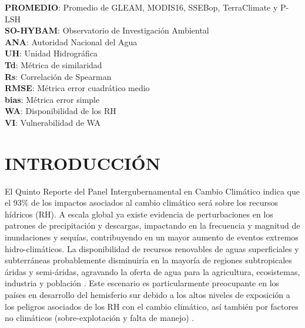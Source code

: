\documentclass[12pt]{article}
\begin{document}
\textbf{PROMEDIO}: Promedio de GLEAM, MODIS16, SSEBop, TerraClimate y P-LSH \\
\textbf{SO-HYBAM}: Observatorio de Investigación Ambiental \\
\textbf{ANA}: Autoridad Nacional del Agua \\
\textbf{UH}: Unidad Hidrográfica \\
\textbf{Td}: Métrica de similaridad \\
\textbf{Rs}: Correlación de Spearman \\
\textbf{RMSE}: Métrica error cuadrático medio \\
\textbf{bias}: Métrica error simple \\
\textbf{WA}: Disponibilidad de los RH \\
\textbf{VI}: Vulnerabilidad de WA \\

\clearpage




\clearpage
\vspace*{0.5mm}
\section{INTRODUCCIÓN}

El Quinto Reporte del Panel Intergubernamental en Cambio Climático \citep[IPCC;][]{Field2014} indica que el 93\% de los impactos asociados al cambio climático será sobre los recursos hídricos (RH). A escala global ya existe evidencia de perturbaciones en los patrones de precipitación y descargas, impactando en la frecuencia y magnitud de inundaciones y sequías, contribuyendo en un mayor aumento de eventos extremos hidro-climáticos. La disponibilidad de recursos renovables de aguas superficiales y subterráneas probablemente disminuiría en la mayoría de regiones subtropicales áridas y semi-áridas, agravando la oferta de agua para la agricultura, ecosistemas, industria y población \citep{Field2014}. Este escenario es particularmente preocupante en los países en desarrollo del hemisferio sur \citep{Satterthwaite2012} debido a los altos niveles de exposición a los peligros asociados de los RH con el cambio climático, así también por factores no climáticos (sobre-explotación y falta de manejo) \citep{MacAlister2018}.
\end{document}
